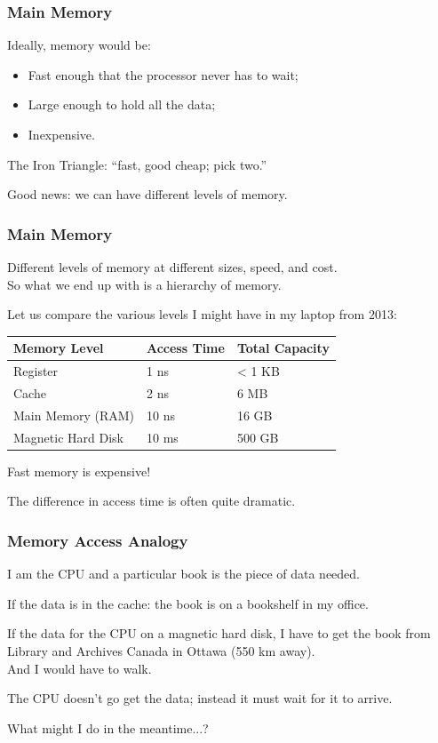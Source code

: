 \begin{frame}
\frametitle{Main Memory}
Ideally, memory would be:

\begin{itemize}
	\item Fast enough that the processor never has to wait;
	\item Large enough to hold all the data;
	\item Inexpensive.
\end{itemize}

The \alert{Iron Triangle}: ``fast, good cheap; pick two.''

Good news: we can have different levels of memory.

\end{frame}

\begin{frame}
\frametitle{Main Memory}

Different levels of memory at different sizes, speed, and cost.\\
\quad So what we end up with is a hierarchy of memory.

Let us compare the various levels I might have in my laptop from 2013:

\begin{center}
	\begin{tabular}{l|l|l}
	\textbf{Memory Level} & \textbf{Access Time} & \textbf{Total Capacity} \\ \hline
	Register & 1 ns & < 1 KB \\
	Cache & 2 ns & 6 MB \\
	Main Memory (RAM) & 10 ns & 16 GB \\
	Magnetic Hard Disk & 10 ms & 500 GB \\
	\end{tabular}
\end{center}

Fast memory is expensive!

The difference in access time is often quite dramatic.

\end{frame}

\begin{frame}
\frametitle{Memory Access Analogy}
I am the CPU and a particular book is the piece of data needed.

If the data is in the cache: the book is on a bookshelf in my office.

If the data for the CPU on a magnetic hard disk, I have to get the book from Library and Archives Canada in Ottawa (550 km away).\\
\quad And I would have to walk.

The CPU doesn't go get the data; instead it must wait for it to arrive.

What might I do in the meantime...?

\end{frame}


